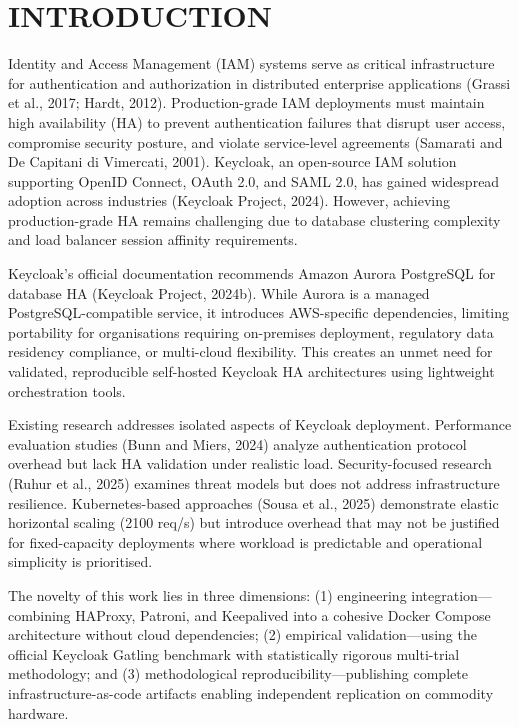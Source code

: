 \documentclass[a4paper,twoside]{article}
\begin{document}
\section{\uppercase{Introduction}}
\label{sec:introduction}

Identity and Access Management (IAM) systems serve as critical infrastructure for authentication and authorization in distributed enterprise applications (Grassi et al., 2017; Hardt, 2012). Production-grade IAM deployments must maintain high availability (HA) to prevent authentication failures that disrupt user access, compromise security posture, and violate service-level agreements (Samarati and De Capitani di Vimercati, 2001). Keycloak, an open-source IAM solution supporting OpenID Connect, OAuth 2.0, and SAML 2.0, has gained widespread adoption across industries (Keycloak Project, 2024). However, achieving production-grade HA remains challenging due to database clustering complexity and load balancer session affinity requirements.

Keycloak's official documentation recommends Amazon Aurora PostgreSQL for database HA (Keycloak Project, 2024b). While Aurora is a managed PostgreSQL-compatible service, it introduces AWS-specific dependencies, limiting portability for organisations requiring on-premises deployment, regulatory data residency compliance, or multi-cloud flexibility. This creates an unmet need for validated, reproducible self-hosted Keycloak HA architectures using lightweight orchestration tools.

Existing research addresses isolated aspects of Keycloak deployment. Performance evaluation studies (Bunn and Miers, 2024) analyze authentication protocol overhead but lack HA validation under realistic load. Security-focused research (Ruhur et al., 2025) examines threat models but does not address infrastructure resilience. Kubernetes-based approaches (Sousa et al., 2025) demonstrate elastic horizontal scaling (2100 req/s) but introduce overhead that may not be justified for fixed-capacity deployments where workload is predictable and operational simplicity is prioritised.

The novelty of this work lies in three dimensions: (1) engineering integration---combining HAProxy, Patroni, and Keepalived into a cohesive Docker Compose architecture without cloud dependencies; (2) empirical validation---using the official Keycloak Gatling benchmark with statistically rigorous multi-trial methodology; and (3) methodological reproducibility---publishing complete infrastructure-as-code artifacts enabling independent replication on commodity hardware.
\end{document}
